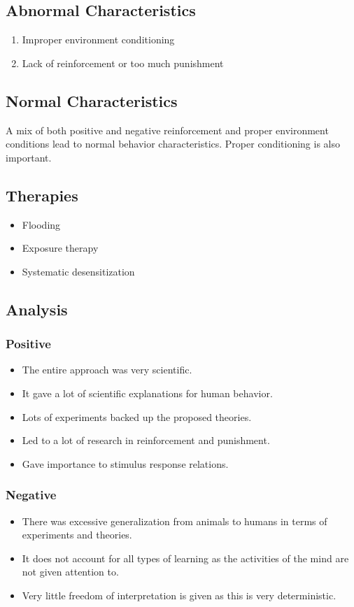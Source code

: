 \documentclass{article}
\begin{document}
		\subsection{Abnormal Characteristics}
			\begin{enumerate}
				\item Improper environment conditioning
				\item Lack of reinforcement or too much punishment
			\end{enumerate}
		\subsection{Normal Characteristics}
			A mix of both positive and negative reinforcement and proper environment conditions lead to normal behavior characteristics. Proper conditioning is also important.
		\subsection{Therapies}
			\begin{itemize}
				\item Flooding
				\item Exposure therapy
				\item Systematic desensitization
			\end{itemize}
		\subsection{Analysis}
			\subsubsection{Positive}
				\begin{itemize}
					\item The entire approach was very scientific.
					\item It gave a lot of scientific explanations for human behavior.
					\item Lots of experiments backed up the proposed theories.
					\item Led to a lot of research in reinforcement and punishment.
					\item Gave importance to stimulus response relations.
				\end{itemize}
			\subsubsection{Negative}
				\begin{itemize}
					\item There was excessive generalization from animals to humans in terms of experiments and theories.
					\item It does not account for all types of learning as the activities of the mind are not given attention to.
					\item Very little freedom of interpretation is given as this is very deterministic.
				\end{itemize}
\end{document}

